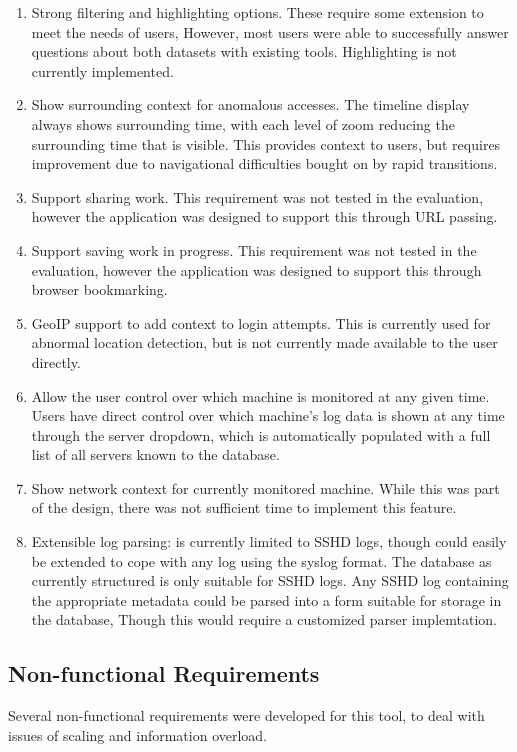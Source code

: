 \begin{enumerate}
\item{Strong filtering and highlighting options. These require some extension to meet the needs of users, However, most users were able to successfully answer questions about both datasets with existing tools. Highlighting is not currently implemented.}
\item{Show surrounding context for anomalous accesses. The timeline display always shows surrounding time, with each level of zoom reducing the surrounding time that is visible. This provides context to users, but requires improvement due to navigational difficulties bought on by rapid transitions.}
\item{Support sharing work. This requirement was not tested in the evaluation, however the application was designed to support this through URL passing.}
\item{Support saving work in progress. This requirement was not tested in the evaluation, however the application was designed to support this through browser bookmarking.}
\item{GeoIP support to add context to login attempts. This is currently used for abnormal location detection, but is not currently made available to the user directly.}
\item{Allow the user control over which machine is monitored at any given time. Users have direct control over which machine's log data is shown at any time through the server dropdown, which is automatically populated with a full list of all servers known to the database.}
\item{Show network context for currently monitored machine. While this was part of the design, there was not sufficient time to implement this feature.}
\item{Extensible log parsing:  is currently limited to SSHD logs, though could easily be extended to cope with any log using the syslog format. The database as currently structured is only suitable for SSHD logs. Any SSHD log containing the appropriate metadata could be parsed into a form suitable for storage in the database, Though this would require a customized parser implemtation.}
\end{enumerate}

\subsection{Non-functional Requirements}
Several non-functional requirements were developed for this tool, to deal with issues of scaling and information overload.

